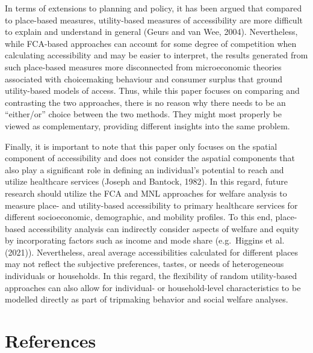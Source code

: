 \documentclass[]{elsarticle} %
\begin{document}
In terms of extensions to planning and policy, it has been argued that
compared to place-based measures, utility-based measures of
accessibility are more difficult to explain and understand in general
(Geurs and van Wee, 2004). Nevertheless, while FCA-based approaches can
account for some degree of competition when calculating accessibility
and may be easier to interpret, the results generated from such
place-based measures more disconnected from microeconomic theories
associated with choicemaking behaviour and consumer surplus that ground
utility-based models of access. Thus, while this paper focuses on
comparing and contrasting the two approaches, there is no reason why
there needs to be an ``either/or'' choice between the two methods. They
might most properly be viewed as complementary, providing different
insights into the same problem.

Finally, it is important to note that this paper only focuses on the
spatial component of accessibility and does not consider the aspatial
components that also play a significant role in defining an individual's
potential to reach and utilize healthcare services (Joseph and Bantock,
1982). In this regard, future research should utilize the FCA and MNL
approaches for welfare analysis to measure place- and utility-based
accessibility to primary healthcare services for different
socioeconomic, demographic, and mobility profiles. To this end,
place-based accessibility analysis can indirectly consider aspects of
welfare and equity by incorporating factors such as income and mode
share (e.g.~Higgins et al. (2021)). Nevertheless, areal average
accessibilities calculated for different places may not reflect the
subjective preferences, tastes, or needs of heterogeneous individuals or
households. In this regard, the flexibility of random utility-based
approaches can also allow for individual- or household-level
characteristics to be modelled directly as part of tripmaking behavior
and social welfare analyses.

\hypertarget{references}{%
\section*{References}\label{references}}
\end{document}

